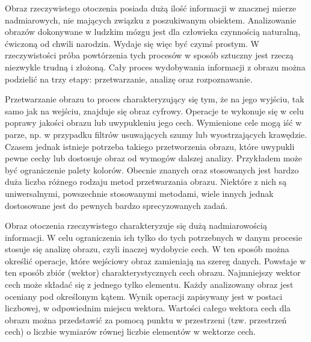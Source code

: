 
Obraz rzeczywistego otoczenia posiada dużą ilość informacji w znacznej mierze nadmiarowych, nie mających związku z poszukiwanym obiektem. Analizowanie obrazów dokonywane w ludzkim mózgu jest dla człowieka czynnością naturalną, ćwiczoną od chwili narodzin. Wydaje się więc być czymś prostym. W rzeczywistości próba powtórzenia tych procesów w sposób sztuczny jest rzeczą niezwykle trudną i złożoną. Cały proces wydobywania informacji z obrazu można podzielić na trzy etapy: przetwarzanie, analizę oraz rozpoznawanie.

Przetwarzanie obrazu to proces charakteryzujący się tym, że na jego wyjściu, tak samo jak na wejściu, znajduje się obraz cyfrowy. Operacje te wykonuje się w celu poprawy jakości obrazu lub uwypukleniu jego cech. Wymienione cele mogą iść w parze, np. w przypadku filtrów usuwających szumy lub wyostrzających krawędzie. Czasem jednak istnieje potrzeba takiego przetworzenia obrazu, które uwypukli pewne cechy lub dostosuje obraz od wymogów dalszej analizy. Przykładem może być ograniczenie palety kolorów. Obecnie znanych oraz stosowanych jest bardzo duża liczba różnego rodzaju metod przetwarzania obrazu. Niektóre z nich są uniwersalnymi, powszechnie stosowanymi metodami, wiele innych jednak dostosowane jest do pewnych bardzo sprecyzowanych zadań.

Obraz otoczenia rzeczywistego charakteryzuje się dużą nadmiarowością informacji. W celu ograniczenia ich tylko do tych potrzebnych w danym procesie stosuje się analizę obrazu, czyli inaczej wydobycie cech. W ten sposób można określić operacje, które wejściowy obraz zamieniają na szereg danych. Powstaje w ten sposób zbiór (wektor) charakterystycznych cech obrazu. Najmniejszy wektor cech może składać się z jednego tylko elementu. Każdy analizowany obraz jest oceniany pod określonym kątem. Wynik operacji zapisywany jest w postaci liczbowej, w odpowiednim miejscu wektora. Wartości całego wektora cech dla obrazu można przedstawić za pomocą punktu w przestrzeni (tzw. przestrzeń cech) o liczbie wymiarów równej liczbie elementów w wektorze cech.

